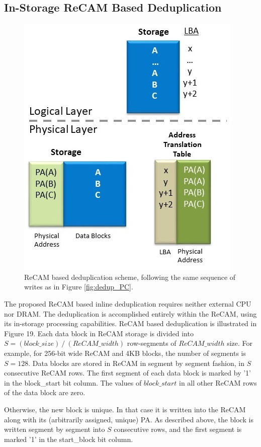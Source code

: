 \documentclass{superfri}
\begin{document}
\subsection{In-Storage ReCAM Based Deduplication}

\begin{figure}[ht!]
	\centerline{\includegraphics[scale=0.6]{Figures/dedup_ReCAM.jpg}}
	\caption{ReCAM based deduplication scheme, following the same sequence of writes as in Figure \ref{fig:dedup_PC}.}
	\label{fig:dedup_ReCAM}
\end{figure}

The proposed ReCAM based inline deduplication requires neither external CPU nor DRAM. The deduplication is accomplished entirely within the ReCAM, using its in-storage processing capabilities. ReCAM based deduplication is illustrated in Figure 19. Each data block in ReCAM storage is divided into $S=(block\_size)⁄(ReCAM\_width)$ row-segments of $ReCAM\_width$ size. For example, for 256-bit wide ReCAM and 4KB blocks, the number of segments is $S=128$. Data blocks are stored in ReCAM in segment by segment fashion, in $S$ consecutive ReCAM rows. The first segment of each data block is marked by '1' in the block\_start bit column. The values of $block\_start$ in all other ReCAM rows of the data block are zero. 

Otherwise, the new block is unique. In that case it is written into the ReCAM along with its (arbitrarily assigned, unique) PA. As described above, the block is written segment by segment into $S$ consecutive rows, and the first segment is marked '1' in the start\_block bit column. 
\end{document}
